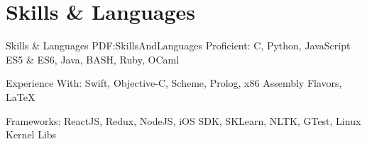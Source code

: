 \section
{Skills \&\newline
Languages}
{Skills \& Languages}
{PDF:SkillsAndLanguages}
\BulletItem
Proficient: C, Python, JavaScript ES5 \& ES6, Java, BASH, Ruby, OCaml

\GapNoBreak
\BulletItem
Experience With: Swift, Objective-C, Scheme, Prolog, x86 Assembly Flavors, {\LaTeX}

\GapNoBreak
\BulletItem
Frameworks: ReactJS, Redux, NodeJS, iOS SDK, SKLearn, NLTK, GTest, Linux Kernel Libs
